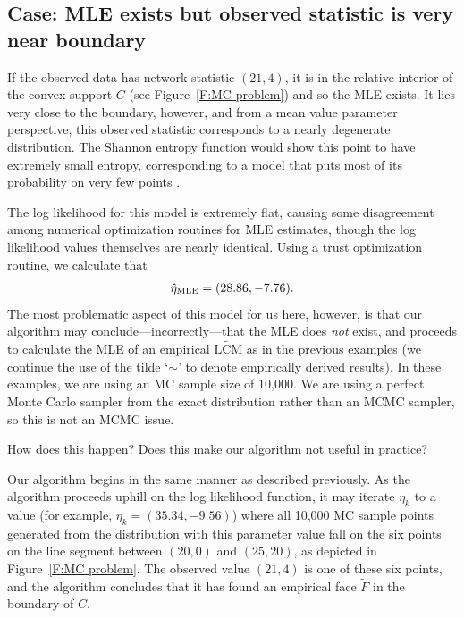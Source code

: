 \subsection{Case: MLE exists but observed statistic is very near boundary} 
\label{S:Example:9node problematic point}
If the observed data has network statistic $(21, 4)$, it is in the relative interior of 
the convex support $C$ (see Figure~\ref{F:MC problem}) and so the MLE exists.
It lies very close to the boundary, however, and from a mean value parameter 
perspective, this observed statistic 
corresponds to a nearly degenerate distribution. The Shannon entropy function would show this 
point to have extremely small entropy, corresponding to a model that puts most of its 
probability on very few points \citep{Rinaldo:2009}.

The log likelihood for this model is extremely flat, causing some disagreement among 
numerical optimization routines for MLE estimates, though the log likelihood values 
themselves are nearly identical.  Using a trust optimization routine, we calculate that 
\begin{align*}
\hat{\eta}_{\textrm{MLE}} = (28.86, -7.76).
\end{align*}
The most problematic aspect of this model for us here, however, is that our algorithm 
may conclude---incorrectly---that the MLE does \emph{not} exist, 
and proceeds to 
calculate the MLE of an empirical $\widetilde{\textrm{LCM}}$ as in the previous examples 
(we continue the use of the tilde `$\sim$' to denote empirically derived results).  
In these examples, we are using
an MC sample size of 10,000.  We are using a perfect Monte Carlo sampler
from the exact distribution rather than an MCMC sampler, so this is not an MCMC issue.

How does this happen?  Does this make our algorithm not useful in practice?

Our algorithm begins in the same manner as described previously.  As the algorithm 
proceeds uphill on the log likelihood function, it may iterate $\eta_k$ to a 
value (for example, $\eta_k = (35.34, -9.56)$) where all 10,000 MC sample points generated 
from the distribution with this parameter value fall on the six points on the line segment 
between $(20,0)$ and $(25,20)$, as depicted in Figure~\ref{F:MC problem}.  
The observed value $(21,4)$ is one of these six points, and the algorithm concludes
that it has found an empirical face $\tilde{F}$ in the boundary of $C$.

